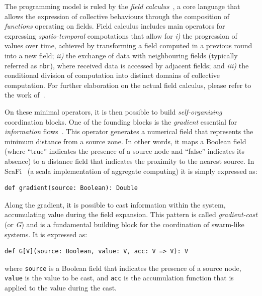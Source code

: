 \documentclass[conference]{IEEEtran}
\begin{document}
The programming model is ruled by the \emph{field calculus}~\cite{DBLP:conf/esocc/ViroliDB13,DBLP:journals/corr/ViroliADPB16,DBLP:journals/tocl/AudritoVDPB19}, 
 a core language that allows the expression of collective behaviours through the composition of \emph{functions} operating on fields.
%
Field calculus includes main operators for expressing \emph{spatio-temporal} compotations that allow for 
\emph{i)} the progression of values over time, achieved by transforming a field computed in a previous round into a new field; 
\emph{ii)} the exchange of data with neighbouring fields (typically referred as \lstinline|nbr|), where received data is accessed by adjacent fields; and 
\emph{iii)} the conditional division of computation into distinct domains of collective computation. 
%
For further elaboration on the actual field calculus, please refer to the work of~\cite{DBLP:journals/jlap/ViroliBDACP19}.

On these minimal operators, 
 it is then possible to build \emph{self-organizing} coordination blocks.
 One of the founding blocks is the \emph{gradient} essential for 
 \emph{information} flows~\cite{DBLP:conf/saso/WolfH07}.
%
This operator generates a numerical field that represents the minimum distance from a source zone. 
%
In other words, it maps a Boolean field (where ``true'' indicates the presence of a source node and ``false'' indicates its absence) to a distance field that indicates the proximity to the nearest source. 
%
In ScaFi~\cite{casadei2022scafi} (a scala implementation of aggregate computing) it is simply expressed as:
\begin{lstlisting}
def gradient(source: Boolean): Double
\end{lstlisting}
Along the gradient, it is possible to cast information within the system, accumulating value during the field expansion. 
This pattern is called \emph{gradient-cast} (or \emph{G}) and is a fundamental building block for the coordination of swarm-like systems.
It is expressed as: 
\begin{lstlisting}
def G[V](source: Boolean, value: V, acc: V => V): V
\end{lstlisting}
where \texttt{source} is a Boolean field that indicates the presence of a source node, 
 \texttt{value} is the value to be cast, and 
 \texttt{acc} is the accumulation function that is applied to the value during the cast.
\end{document}
